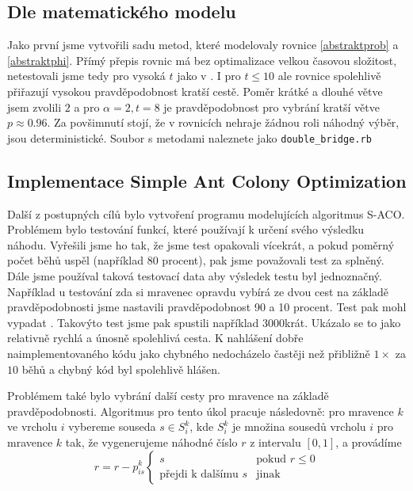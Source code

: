 \documentclass[12pt]{article}
\begin{document}
\subsection{Dle matematického modelu}
Jako první jsme vytvořili sadu metod, které modelovaly rovnice \eqref{abstraktprob} a \eqref{abstraktphi}. Přímý přepis rovnic má bez optimalizace velkou časovou složitost, netestovali jsme tedy pro vysoká $t$ jako v \cite{maniezzo2004}. I pro $t \le 10$ ale rovnice spolehlivě přiřazují vysokou pravděpodobnost kratší cestě. Poměr krátké a dlouhé větve jsem zvolili $2$ a pro $\alpha = 2, t = 8$ je pravděpodobnost pro vybrání kratší větve $p \approx 0.96$. Za povšimnutí stojí, že v rovnicích nehraje žádnou roli náhodný výběr, jsou deterministické. Soubor s metodami naleznete jako \texttt{double\_bridge.rb}

\subsection{Implementace Simple Ant Colony Optimization}
Další z postupných cílů bylo vytvoření programu modelujících algoritmus S-ACO. Problémem bylo testování funkcí, které používají k určení svého výsledku náhodu. Vyřešili jsme ho tak, že jsme test opakovali vícekrát, a pokud poměrný počet běhů uspěl (například 80 procent), pak jsme považovali test za splněný. Dále jsme používal taková testovací data aby výsledek testu byl jednoznačný. Například u testování zda si mravenec opravdu vybírá ze dvou cest na základě pravděpodobnosti jsme nastavili pravděpodobnost 90 a 10 procent. Test pak mohl vypadat . Takovýto test jsme pak spustili například 3000krát. Ukázalo se to jako relativně rychlá a únosně spolehlivá cesta. K nahlášení dobře naimplementovaného kódu jako chybného nedocházelo častěji než přibližně $1\times$ za $10$ běhů a chybný kód byl spolehlivě hlášen. 

Problémem také bylo vybrání další cesty pro mravence na základě pravděpodobnosti. Algoritmus pro tento úkol pracuje následovně: pro mravence $k$ ve vrcholu $i$ vybereme souseda $s \in S_{i}^k$, kde $S_i^k$ je množina sousedů vrcholu $i$ pro mravence $k$ tak, že vygenerujeme náhodné číslo $r$ z intervalu $ \left[ 0,1 \right]$, a provádíme 
\begin{equation}
  r = r - p_{is}^k 
  \begin{cases}
  	s                           &\text{pokud $r \leq 0$}
\\
	\text{přejdi k dalšímu $s$} &\text{jinak}
  \end{cases}
\end{equation}
\end{document}
